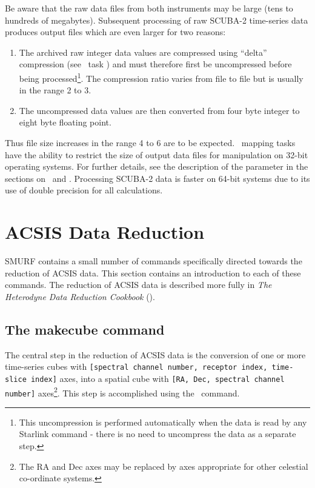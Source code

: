 \documentclass[oneside,11pt]{starlink}
\begin{document}
Be aware that the raw data files from both instruments may be large
(tens to hundreds of megabytes). Subsequent processing of raw SCUBA-2
time-series data produces output files which are even larger for two
reasons:

\begin{enumerate}
\item The archived raw integer data values are compressed using ``delta''
compression (see \KAPPA\ task \ndfcompress) and must therefore first be
uncompressed before being processed\footnote{This uncompression is
performed automatically when the data is read by any Starlink command - there
is no need to uncompress the data as a separate step.}. The compression ratio
varies from file to file but is usually in the range 2 to 3.
\item The uncompressed data values are then converted from four byte
integer to eight byte floating point.
\end{enumerate}

Thus file size increases in the range 4 to 6 are to be expected. \SMURF\
mapping tasks have the ability to restrict the size of output data files
for manipulation on 32-bit operating systems. For further details, see
the description of the \aparam{TILEDIMS} parameter in the sections on
\makemap\ and \makecube. Processing SCUBA-2 data is faster on 64-bit systems
due to its use of double precision for all calculations.

\section{ACSIS Data Reduction\label{se:acsisdr}}

SMURF contains a small number of commands specifically directed towards
the reduction of ACSIS data. This section contains an introduction to
each of these commands. The reduction of ACSIS data is described
more fully in \emph{The Heterodyne Data Reduction Cookbook}
().

\subsection{The makecube command}

The central step in the reduction of ACSIS data is the conversion of one
or more time-series cubes with \texttt{[spectral channel number, receptor
index, time-slice index]} axes, into a spatial cube with \texttt{[RA, Dec, spectral channel number]} axes\footnote{The RA and Dec axes may
be replaced by axes appropriate for other celestial co-ordinate
systems.}. This step is accomplished using the \makecube\ command.
\end{document}

